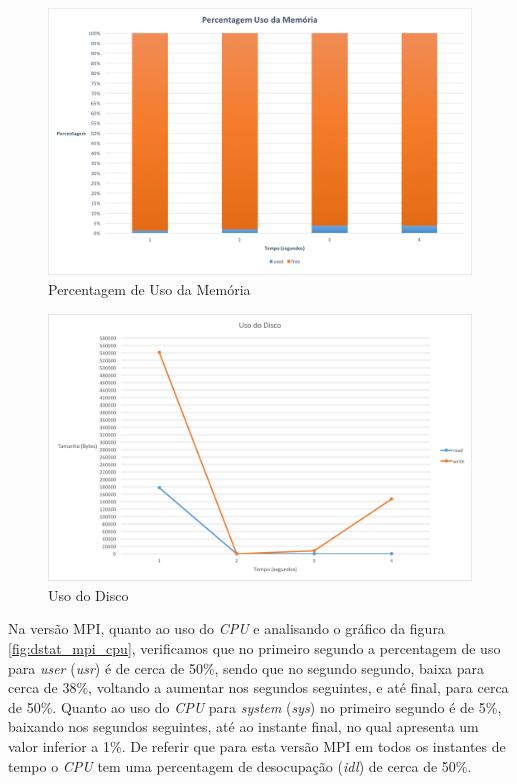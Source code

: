 \documentclass[conference,compsoc]{IEEEtran}
\begin{document}
\begin{figure}[h!]
\centering
\includegraphics[scale=0.325]{dstat/MPI/dstat_mpi_memoria.png}
\caption{Percentagem de Uso da Memória}
\label{fig:dstat_mpi_memoria}
\end{figure}

\begin{figure}[h!]
\centering
\includegraphics[scale=0.325]{dstat/MPI/dstat_mpi_disco.png}
\caption{Uso do Disco}
\label{fig:dstat_mpi_disco}
\end{figure}

Na versão MPI, quanto ao uso do \textit{CPU} e analisando o gráfico da figura \ref{fig:dstat_mpi_cpu}, verificamos que no primeiro segundo a percentagem de uso para \textit{user} (\textit{usr}) é de cerca de 50\%, sendo que no segundo segundo, baixa para cerca de 38\%, voltando a aumentar nos segundos seguintes, e até final, para cerca de 50\%. Quanto ao uso do \textit{CPU} para \textit{system} (\textit{sys}) no primeiro segundo é de 5\%, baixando nos segundos seguintes, até ao instante final, no qual apresenta um valor inferior a 1\%. De referir que para esta versão MPI em todos os instantes de tempo o \textit{CPU} tem uma percentagem de desocupação (\textit{idl}) de cerca de 50\%.
\end{document}
